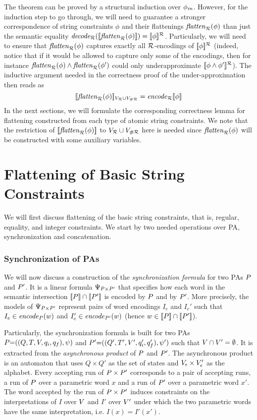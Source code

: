 \documentclass[sigplan,screen]{acmart}
\begin{document}
The theorem can be proved by a structural induction over $\phi_{\mathit{in}}$.
However, for the induction step to go through, we will need to guarantee a stronger correspondence of string constraints $\phi$ and their flattenings $\mathit{flatten}_{\mathcal{R}}(\phi)$ than just the semantic equality $\mathit{decode_{\mathcal{R}}} ([\![\mathit{flatten}_{\mathcal{R}}(\phi)]\!]) = [\![\phi]\!]^{\mathcal{R}}$.  
Particularly, we will need to
 ensure that $\mathit{flatten}_{\mathcal{R}}(\phi)$ captures exactly all $\mathcal{R}$-encodings of $[\![\phi]\!]^{\mathcal{R}}$
(indeed, notice that if it would be allowed to capture only some of the encodings, then for instance $\mathit{flatten}_{\mathcal{R}}(\phi) \land \mathit{flatten}_{\mathcal{R}}(\phi')$ could only underapproximate $[\![\phi\land\phi']\!]^{\mathcal{R}}$).
The inductive argument needed in the correctness proof of the under-approximation then reads as
$$[\![\mathit{flatten}_{\mathcal{R}}(\phi)]\!]_{V_{\mathcal{R}}\cup V_{\#\mathcal{R}}}  = \mathit{encode}_{\mathcal{R}}{[\![\phi]\!]}$$ 
%
In the next sections, 
we will formulate the corresponding correctness lemma for flattening constructed from each type of atomic string constraints.
%
We note that the restriction of $[\![\mathit{flatten}_{\mathcal{R}}(\phi)]\!]$ to $V_{\mathcal{R}}\cup V_{\#\mathcal{R}}$ here is needed since $\mathit{flatten}_{\mathcal{R}}(\phi)$ will be constructed with some auxiliary variables. 



\section{Flattening of Basic String Constraints}
\label{sec:flattening}
We will first discuss flattening of the basic string constraints, that is,
regular, equality, and integer constraints. We start by two needed operations over PA, synchronization and concatenation.

\subsubsection*{Synchronization of PAs}
We will now discuss a construction of the \emph{synchronization formula} for two PAs $P$ and $P'$. 
It is a linear formula $\Psi_{P \times P'}$ 
that specifies how each word in the semantic intersection $[\![P]\!] \cap [\![P']\!]$ is encoded by $P$ and by $P'$.
%
More precisely, the models of $\Psi_{P \times P'}$ represent pairs of word
encodings 
$I_e$ and $I_e'$ such that $I_e\in\mathit{encode}_{P}(w)$ and $I_e'\in\mathit{encode}_{P'} (w)$ (hence $w\in[\![P]\!]\cap[\![P']\!]$).


Particularly, the synchronization formula is built for two PAs  
$P {=} ((Q,T,V,q_i,q_f),\psi)$ and ${P'} {=} ((Q',T',V',q_i',q_f'),\psi')$ such that $V \cap V' = \emptyset$. 
%
It is extracted from the \emph{asynchronous product} of $P$ and $P'$. 
%
The asynchronous product is an automaton that uses $Q\times Q'$ as the set of states and 
$V_\epsilon\times V'_\epsilon$
as the alphabet. 
%
Every accepting run of $P \times P'$ corresponds to a pair of accepting runs, 
a run of $P$ over a parametric word $x$ and a run of ${P'}$ over a parametric word $x'$. 
The word accepted by the run of $P \times P'$ induces constraints on the interpretations of $I$ over $V$ and $I'$ over $V'$ under which the two parametric words have the same interpretation, i.e. $I(x) = I'(x')$. 
\end{document}
